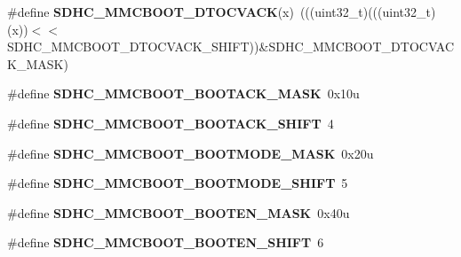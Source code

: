 \begin{DoxyCompactItemize}
\item 
\#define {\bfseries S\+D\+H\+C\+\_\+\+M\+M\+C\+B\+O\+O\+T\+\_\+\+D\+T\+O\+C\+V\+A\+CK}(x)~(((uint32\+\_\+t)(((uint32\+\_\+t)(x))$<$$<$S\+D\+H\+C\+\_\+\+M\+M\+C\+B\+O\+O\+T\+\_\+\+D\+T\+O\+C\+V\+A\+C\+K\+\_\+\+S\+H\+I\+FT))\&S\+D\+H\+C\+\_\+\+M\+M\+C\+B\+O\+O\+T\+\_\+\+D\+T\+O\+C\+V\+A\+C\+K\+\_\+\+M\+A\+SK)\hypertarget{group__SDHC__Register__Masks_ga51ddb837c8ee3f7997ab5e64bd5b6bfa}{}\label{group__SDHC__Register__Masks_ga51ddb837c8ee3f7997ab5e64bd5b6bfa}

\item 
\#define {\bfseries S\+D\+H\+C\+\_\+\+M\+M\+C\+B\+O\+O\+T\+\_\+\+B\+O\+O\+T\+A\+C\+K\+\_\+\+M\+A\+SK}~0x10u\hypertarget{group__SDHC__Register__Masks_ga878fce0feabab8806e311871a08386c9}{}\label{group__SDHC__Register__Masks_ga878fce0feabab8806e311871a08386c9}

\item 
\#define {\bfseries S\+D\+H\+C\+\_\+\+M\+M\+C\+B\+O\+O\+T\+\_\+\+B\+O\+O\+T\+A\+C\+K\+\_\+\+S\+H\+I\+FT}~4\hypertarget{group__SDHC__Register__Masks_gadd901321f62235462c051a551b132354}{}\label{group__SDHC__Register__Masks_gadd901321f62235462c051a551b132354}

\item 
\#define {\bfseries S\+D\+H\+C\+\_\+\+M\+M\+C\+B\+O\+O\+T\+\_\+\+B\+O\+O\+T\+M\+O\+D\+E\+\_\+\+M\+A\+SK}~0x20u\hypertarget{group__SDHC__Register__Masks_ga0cdf366302c98d1227b0092048c0ac5a}{}\label{group__SDHC__Register__Masks_ga0cdf366302c98d1227b0092048c0ac5a}

\item 
\#define {\bfseries S\+D\+H\+C\+\_\+\+M\+M\+C\+B\+O\+O\+T\+\_\+\+B\+O\+O\+T\+M\+O\+D\+E\+\_\+\+S\+H\+I\+FT}~5\hypertarget{group__SDHC__Register__Masks_ga2f4f7807f581a3e18d0f1e9f151f74b3}{}\label{group__SDHC__Register__Masks_ga2f4f7807f581a3e18d0f1e9f151f74b3}

\item 
\#define {\bfseries S\+D\+H\+C\+\_\+\+M\+M\+C\+B\+O\+O\+T\+\_\+\+B\+O\+O\+T\+E\+N\+\_\+\+M\+A\+SK}~0x40u\hypertarget{group__SDHC__Register__Masks_ga0e740cc62404161ed68d4ce1ecf30971}{}\label{group__SDHC__Register__Masks_ga0e740cc62404161ed68d4ce1ecf30971}

\item 
\#define {\bfseries S\+D\+H\+C\+\_\+\+M\+M\+C\+B\+O\+O\+T\+\_\+\+B\+O\+O\+T\+E\+N\+\_\+\+S\+H\+I\+FT}~6\hypertarget{group__SDHC__Register__Masks_ga1c83fde2fa55c8091ecd1768300614be}{}\label{group__SDHC__Register__Masks_ga1c83fde2fa55c8091ecd1768300614be}


\end{DoxyCompactItemize}
